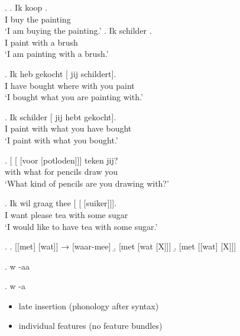 \documentclass[xcolor=dvipsnames,10pt]{beamer}
\begin{document}
\begin{frame}

\ex.
\ag. Ik koop  .\\
 I buy the painting\\
 `I am buying the painting.'\label{ex:kopen}
\bg. Ik schilder   .\\
 I paint with a brush\\
 `I am painting with a brush.'\label{ex:schilderen}

 \pause

\exg. Ik heb gekocht [  jij schildert].\\
 I have bought where with you paint\\
 `I bought what you are painting with.'\label{ex:mismatchwaar-mee}

 \pause

\exg. Ik schilder  [ jij hebt gekocht].\\
 I paint with what you have bought\\
 `I paint with what you bought.'\label{ex:mismatchmetwat}

\end{frame}



\begin{frame}

\exg. [ [ [voor [potloden]]] teken jij?\\
 with what for pencils draw you\\
 `What kind of pencils are you drawing with?'\label{ex:watwasfur}

\pause

\exg. Ik wil graag thee [ [ [suiker]]].\\
 I want please tea with some sugar\\
 `I would like to have tea with some sugar.'\label{ex:watindef}

\pause

\ex.\label{ex:summaryconst}
\a. [[met] [wat]] → [waar-mee]\label{ex:waar-meefr}
\b. [met [wat [X]]]\label{ex:metwatx}
\b. [met [[wat] [X]]]\label{ex:metwatfr}

\end{frame}


\begin{frame}

\ex. w -aa  

\ex.  w -a 

\pause

\begin{itemize}
\item late insertion (phonology after syntax)\pause
\item individual features (no feature bundles)
\end{itemize}


\end{frame}
\end{document}
